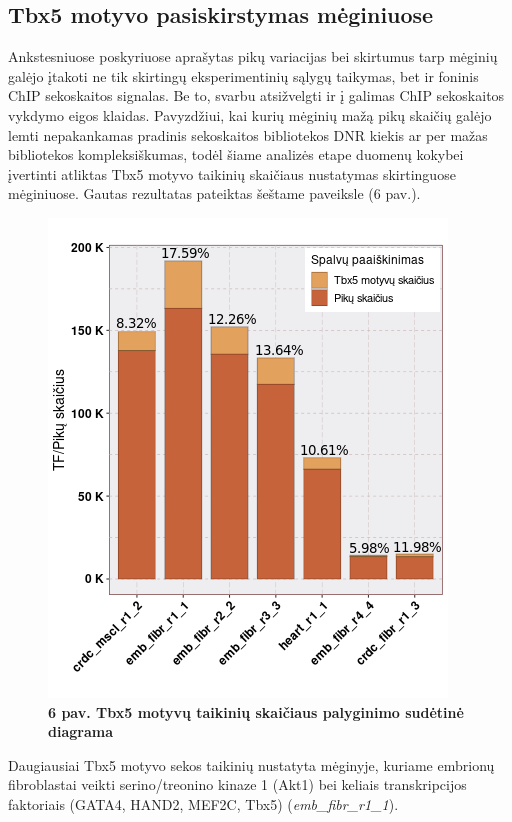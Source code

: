 \documentclass[12pt]{article}
\begin{document}
\newpage


\subsection{Tbx5 motyvo pasiskirstymas mėginiuose}
Ankstesniuose poskyriuose aprašytas pikų variacijas bei skirtumus tarp mėginių
galėjo įtakoti ne tik skirtingų eksperimentinių sąlygų taikymas, bet ir
foninis ChIP sekoskaitos signalas. Be to, svarbu atsižvelgti ir į galimas ChIP
sekoskaitos vykdymo eigos klaidas. Pavyzdžiui, kai kurių mėginių mažą pikų
skaičių galėjo lemti nepakankamas pradinis sekoskaitos bibliotekos DNR kiekis
ar per mažas bibliotekos kompleksiškumas, todėl šiame analizės etape duomenų
kokybei įvertinti atliktas Tbx5 motyvo taikinių skaičiaus nustatymas
skirtinguose mėginiuose. Gautas rezultatas pateiktas šeštame paveiksle (6 pav.).

\begin{figure}[htb]
    \begin{center}
        \includegraphics[width=0.5\linewidth]{../Figures/tf_hit_percentage.png}
        \vspace{-2\baselineskip}
        \caption*{\small\textbf{6 pav. Tbx5 motyvų taikinių skaičiaus palyginimo
                                sudėtinė diagrama}}
    \end{center}
\end{figure}

Daugiausiai Tbx5 motyvo sekos taikinių nustatyta mėginyje,
kuriame embrionų fibroblastai veikti serino/treonino kinaze 1 (Akt1) bei
keliais transkripcijos faktoriais (GATA4, HAND2, MEF2C, Tbx5)
(\small\emph{emb\_fibr\_r1\_1}).
\end{document}
